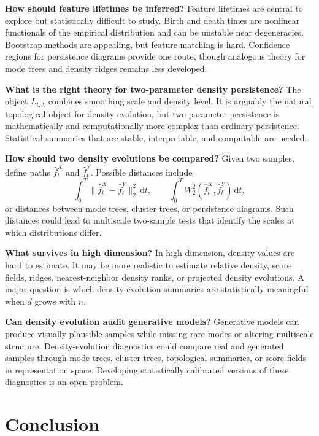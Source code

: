 \documentclass[preprint]{imsart}
\theoremstyle{plain}
\theoremstyle{definition}
\newcommand{\dd}{\,\mathrm{d}}
\newcommand{\fhat}{\widehat f}
\begin{document}
\smallskip 
\noindent \textbf{How should feature lifetimes be inferred?} Feature lifetimes are central to explore but statistically difficult to study. Birth and death times are nonlinear functionals of the empirical distribution and can be unstable near degeneracies. Bootstrap methods are appealing, but feature matching is hard. Confidence regions for persistence diagrams provide one route, though analogous theory for mode trees and density ridges remains less developed.

\smallskip 
\noindent \textbf{What is the right theory for two-parameter density persistence?} The object $L_{t,\lambda}$ combines smoothing scale and density level. It is arguably the natural topological object for density evolution, but two-parameter persistence is mathematically and computationally more complex than ordinary persistence. Statistical summaries that are stable, interpretable, and computable are needed.


\smallskip 
\noindent \textbf{How should two density evolutions be compared?} Given two samples, define paths $\fhat_t^X$ and $\fhat_t^Y$. Possible distances include
\[
  \int_0^T \|\fhat_t^X-\fhat_t^Y\|_2^2\dd t,
  \qquad
  \int_0^T W_2^2(\fhat_t^X,\fhat_t^Y)\dd t,
\]
or distances between mode trees, cluster trees, or persistence diagrams. Such distances could lead to multiscale two-sample tests that identify the scales at which distributions differ.

\smallskip 
\noindent \textbf{What survives in high dimension?} In high dimension, density values are hard to estimate. It may be more realistic to estimate relative density, score fields, ridges, nearest-neighbor density ranks, or projected density evolutions. A major question is which density-evolution summaries are statistically meaningful when $d$ grows with $n$.

\smallskip 
\noindent \textbf{Can density evolution audit generative models?} Generative models can produce visually plausible samples while missing rare modes or altering multiscale structure. Density-evolution diagnostics could compare real and generated samples through mode trees, cluster trees, topological summaries, or score fields in representation space. Developing statistically calibrated versions of these diagnostics is an open problem.


\section{Conclusion}
\label{sec:conclusion}
\end{document}
